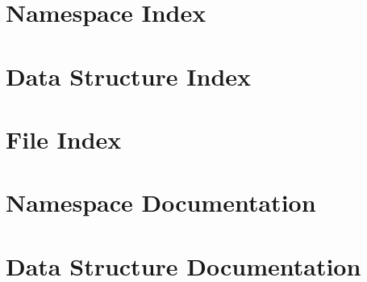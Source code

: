 \let\mypdfximage\pdfximage\def\pdfximage{\immediate\mypdfximage}\documentclass[twoside]{book}
\newcommand{\+}{\discretionary{\mbox{\scriptsize$\hookleftarrow$}}{}{}}
\begin{document}
\chapter{Namespace Index}

\chapter{Data Structure Index}

\chapter{File Index}

\chapter{Namespace Documentation}




\chapter{Data Structure Documentation}









\end{document}
